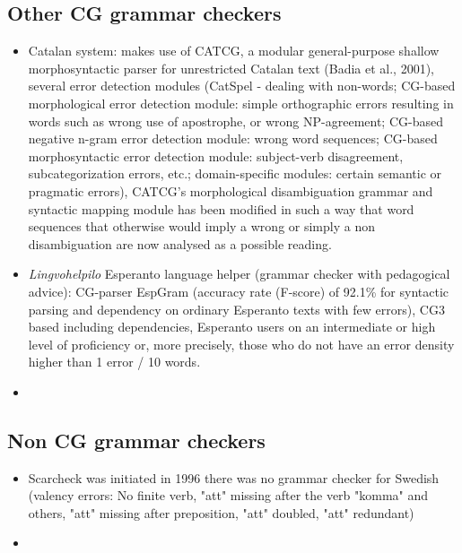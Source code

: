 \documentclass[a4paper,english,12pt]{article}
\begin{document}
\begin{spacing}{1.0}
\section{Other CG grammar checkers}

\begin{itemize}
\item Catalan system: makes use of CATCG, a modular general-purpose shallow morphosyntactic parser for unrestricted Catalan text (Badia et al., 2001), several error detection modules (CatSpel - dealing with non-words; CG-based morphological error detection module: simple orthographic errors resulting in words such as wrong use of apostrophe, or wrong NP-agreement; CG-based negative n-gram error detection module: wrong word sequences; CG-based morphosyntactic error detection module: subject-verb disagreement, subcategorization errors, etc.; domain-specific modules: certain semantic or pragmatic errors), CATCG’s morphological disambiguation grammar and syntactic mapping module has been modified in such a way that word sequences that otherwise would imply a wrong or simply a non disambiguation are now analysed as a possible reading.
\item \textit{Lingvohelpilo} Esperanto language helper (grammar checker with pedagogical advice): CG-parser EspGram (accuracy rate (F-score) of 92.1\% for syntactic parsing and dependency on ordinary Esperanto texts with few errors), CG3 based including dependencies, Esperanto users on an intermediate or high level of proficiency or, more precisely, those who do not have an error density higher than 1 error / 10 words.
\item
\end{itemize}

\subsection{Non CG grammar checkers}

\begin{itemize}
\item Scarcheck was initiated in 1996 there was no grammar checker for Swedish (valency errors: No finite verb, "att" missing after the verb "komma" and others, "att" missing after preposition, "att" doubled, "att" redundant)
\item 
\end{itemize}


\end{spacing}
\end{document}
